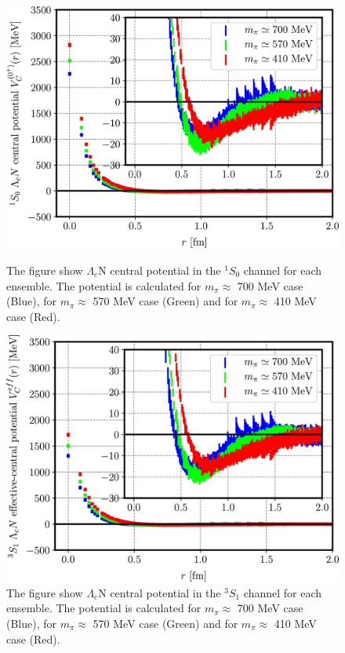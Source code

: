 \documentclass[12pt,a4paper]{book}
\begin{document}
	\begin{figure}
		\centering
		\begin{minipage}{0.45\textwidth}
			\centering
			\includegraphics[width=0.8 \linewidth]{pictures/radial_potential_1s.jpg}
			\caption{ The figure show $\Lambda_c$N central potential in the $ ^{1}S_0$ channel for each ensemble. The potential is calculated for $m_\pi \approx$ 700 MeV case (Blue), for $m_\pi \approx$ 570 MeV case (Green) and for $m_\pi \approx$ 410 MeV case (Red).}
			\label{fig:radial_potential_1s}
			\hspace{1cm}  
		\end{minipage}
		\begin{minipage}{0.445\textwidth}
			\centering
			\includegraphics[width=0.8 \linewidth]{pictures/radial_potential_3s.jpg}
			\caption{ The figure show $\Lambda_c$N central potential in the $ ^{3}S_1$ channel for each ensemble. The potential is calculated for $m_\pi \approx$ 700 MeV case (Blue), for $m_\pi \approx$  570 MeV case (Green) and for $m_\pi \approx$  410 MeV case (Red).}
			\label{fig:radial_potential_3s}
		\end{minipage}%
	\end{figure}
	
\end{document}
